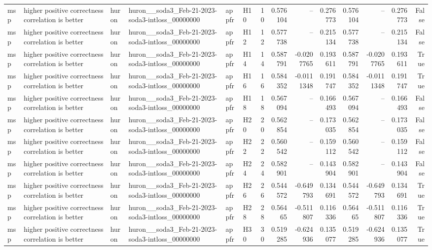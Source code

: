\begin{longtable}{llllllrrrrrrrr}
msp & higher positive correctness correlation is better & huron & huron\_\_soda3\_Feb-21-2023-soda3-intloss\_00000000 & appfr & H10 & 10 & 0.576104 & -- & 0.276773 & 0.576104 & -- & 0.276773 & False \\
msp & higher positive correctness correlation is better & huron & huron\_\_soda3\_Feb-21-2023-soda3-intloss\_00000000 & appfr & H12 & 12 & 0.577738 & -- & 0.215134 & 0.577738 & -- & 0.215134 & False \\
msp & higher positive correctness correlation is better & huron & huron\_\_soda3\_Feb-21-2023-soda3-intloss\_00000000 & appfr & H14 & 14 & 0.587791 & -0.0207765 & 0.193611 & 0.587791 & -0.0207765 & 0.193611 & True \\
msp & higher positive correctness correlation is better & huron & huron\_\_soda3\_Feb-21-2023-soda3-intloss\_00000000 & appfr & H16 & 16 & 0.584352 & -0.0111348 & 0.191747 & 0.584352 & -0.0111348 & 0.191747 & True \\
msp & higher positive correctness correlation is better & huron & huron\_\_soda3\_Feb-21-2023-soda3-intloss\_00000000 & appfr & H18 & 18 & 0.567094 & -- & 0.166493 & 0.567094 & -- & 0.166493 & False \\
msp & higher positive correctness correlation is better & huron & huron\_\_soda3\_Feb-21-2023-soda3-intloss\_00000000 & appfr & H20 & 20 & 0.562854 & -- & 0.173035 & 0.562854 & -- & 0.173035 & False \\
msp & higher positive correctness correlation is better & huron & huron\_\_soda3\_Feb-21-2023-soda3-intloss\_00000000 & appfr & H22 & 22 & 0.560542 & -- & 0.159112 & 0.560542 & -- & 0.159112 & False \\
msp & higher positive correctness correlation is better & huron & huron\_\_soda3\_Feb-21-2023-soda3-intloss\_00000000 & appfr & H24 & 24 & 0.582901 & -- & 0.143904 & 0.582901 & -- & 0.143904 & False \\
msp & higher positive correctness correlation is better & huron & huron\_\_soda3\_Feb-21-2023-soda3-intloss\_00000000 & appfr & H26 & 26 & 0.544572 & -0.649793 & 0.134691 & 0.544572 & -0.649793 & 0.134691 & True \\
msp & higher positive correctness correlation is better & huron & huron\_\_soda3\_Feb-21-2023-soda3-intloss\_00000000 & appfr & H28 & 28 & 0.56465 & -0.511807 & 0.116336 & 0.56465 & -0.511807 & 0.116336 & True \\
msp & higher positive correctness correlation is better & huron & huron\_\_soda3\_Feb-21-2023-soda3-intloss\_00000000 & appfr & H30 & 30 & 0.519285 & -0.624936 & 0.135077 & 0.519285 & -0.624936 & 0.135077 & True \\

\end{longtable}
